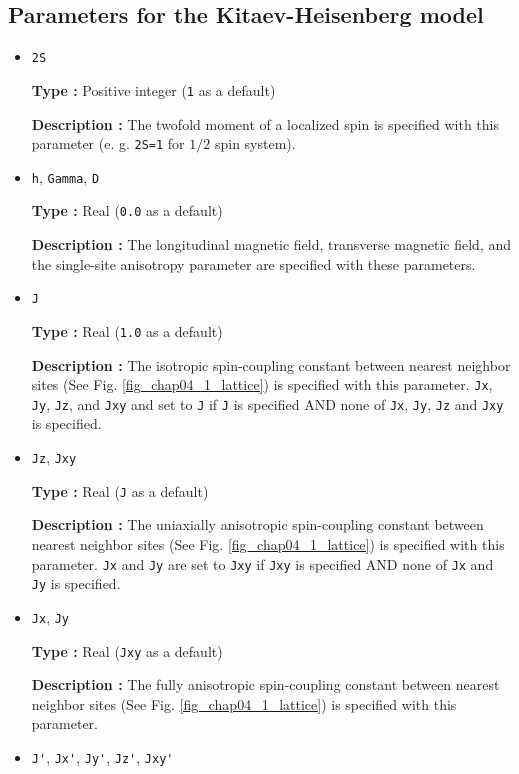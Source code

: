 \subsection{Parameters for the Kitaev-Heisenberg model}
\begin{itemize}
\item \verb|2S|

{\bf Type :} Positive integer (\verb|1| as a default)

{\bf Description :} The twofold moment of a localized spin is specified 
with this parameter (e. g. \verb|2S=1| for $1/2$ spin system). 

\item \verb|h|, \verb|Gamma|, \verb|D|

{\bf Type :} Real (\verb|0.0| as a default)

{\bf Description :} The longitudinal magnetic field, transverse magnetic field, 
and the single-site anisotropy parameter are specified with these parameters.

\item \verb|J|

{\bf Type :} Real (\verb|1.0| as a default)

{\bf Description :} The isotropic spin-coupling constant between nearest neighbor sites
(See Fig. \ref{fig_chap04_1_lattice}) is specified with this parameter.
\verb|Jx|, \verb|Jy|, \verb|Jz|, and \verb|Jxy| and set to \verb|J|
if \verb|J| is specified AND none of \verb|Jx|, \verb|Jy|, \verb|Jz| and \verb|Jxy| is specified.

\item \verb|Jz|, \verb|Jxy|

{\bf Type :} Real (\verb|J| as a default)

{\bf Description :} The uniaxially anisotropic spin-coupling constant between nearest neighbor sites
(See Fig. \ref{fig_chap04_1_lattice}) is specified with this parameter.
\verb|Jx| and \verb|Jy| are set to \verb|Jxy|
if \verb|Jxy| is specified AND none of \verb|Jx| and \verb|Jy| is specified.

\item \verb|Jx|, \verb|Jy|

{\bf Type :} Real (\verb|Jxy| as a default)

{\bf Description :} The fully anisotropic spin-coupling constant between nearest neighbor sites
(See Fig. \ref{fig_chap04_1_lattice}) is specified with this parameter.

\item \verb|J'|, \verb|Jx'|, \verb|Jy'|, \verb|Jz'|, \verb|Jxy'|


\end{itemize}
